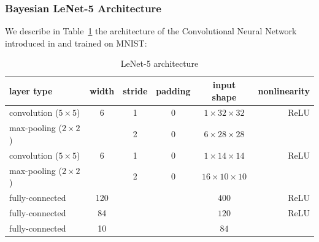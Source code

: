 \documentclass[11pt]{article}
\theoremstyle{t}
\begin{document}
 \subsubsection{Bayesian LeNet-5 Architecture}\label{appendix:bnn}
We describe in Table~\ref{table:lenet} the architecture of the Convolutional Neural Network introduced in \citep{lecun1998gradient} and trained on MNIST:
\begin{table}[H]
\begin{center}
\begin{tabular}{ l c c c c r}
  \hline
  layer type & width & stride& padding & input shape& nonlinearity \\
  \hline
convolution ($5 \times 5$) & 6 & 1 & 0 & $1 \times 32 \times 32$ & ReLU \\
max-pooling ($2 \times 2$) &  & 2 & 0 & $6 \times 28 \times 28$ & \\
convolution ($5 \times 5$) & 6 & 1 & 0 & $1 \times 14 \times 14$ & ReLU \\
max-pooling ($2 \times 2$) &  & 2 & 0 & $16 \times 10 \times 10$ & \\
fully-connected & 120 &  &  & $400$ & ReLU \\
fully-connected & 84 &  &  & $ 120$ & ReLU \\
fully-connected & 10 &  &  & $ 84$ &  \\
  \hline
\end{tabular}
    \caption{LeNet-5 architecture}    \label{table:lenet}
\end{center}
\end{table}
\end{document}

